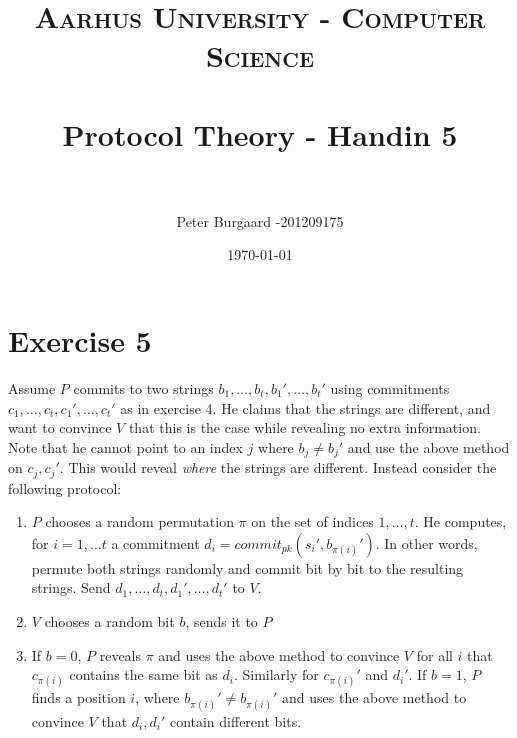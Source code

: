 \documentclass[paper=a4, fontsize=11pt]{scrartcl} %
\title{	
	\normalfont \normalsize 
	\textsc{Aarhus University - Computer Science} \\ [25pt] %
	\horrule{0.5pt} \\[0.4cm] %
	\huge Protocol Theory - Handin 5 \\ %
	\horrule{2pt} \\[0.5cm] %
}
\author{Peter Burgaard -201209175} %
\date{\normalsize\today} %
\numberwithin{equation}{section} %
\numberwithin{figure}{section} %
\numberwithin{table}{section} %
\begin{document}
	
	\maketitle %
	
	\section*{Exercise 5}

	Assume $P$ commits to two strings $b_1,\dots,b_t,b_1',\dots,b_t'$ using commitments $c_1,\dots,c_t,c_1',\dots,c_t'$ as in exercise 4. He claims that the strings are different, and want to convince $V$ that this is the case while revealing no extra information. Note that he cannot point to an index $j$ where $b_j\not= b_j'$ and use the above method on $c_j,c_j'$. This would reveal \textit{where} the strings are different. Instead consider the following protocol:
	\begin{enumerate}
		\item $P$ chooses a random permutation $\pi$ on the set of indices ${1,\dots ,t}$. He computes, for $i=1,\dots t$ a commitment $d_i=commit_{pk}(s_i',b_{\pi(i)}')$. In other words, permute both strings randomly and commit bit by bit to the resulting strings. Send $d_1,\dots,d_t,d_1',\dots,d_t'$ to $V$.
		\item $V$ chooses a random bit $b$, sends it to $P$
		\item If $b=0$, $P$ reveals $\pi$ and uses the above method to convince $V$ for all $i$ that $c_{\pi(i)}$ contains the same bit as $d_i$. Similarly for $c_{\pi(i)}'$ and $d_i'$. If $b=1$, $P$ finds a position $i$, where $b_{\pi(i)}'\not=b_{\pi(i)}'$ and uses the above method to convince $V$ that $d_i,d_i'$ contain different bits.
	\end{enumerate}
	
\end{document}
